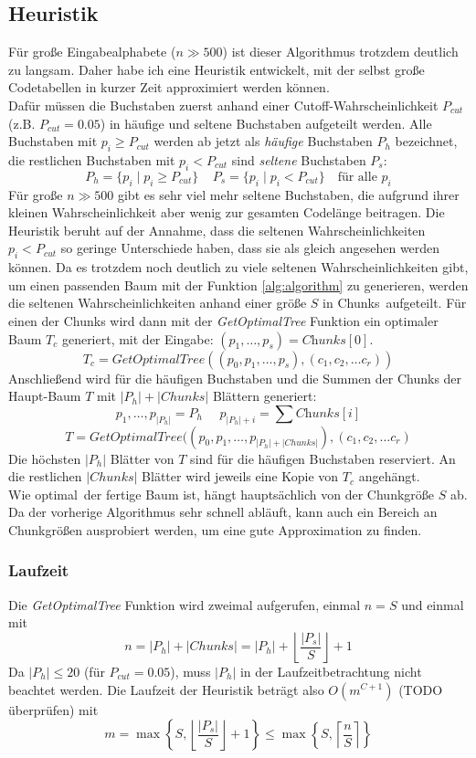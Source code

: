 \documentclass[a4paper,10pt,ngerman]{scrartcl}
\begin{document}
    \subsection{Heuristik}
    Für große Eingabealphabete ($n \gg 500$) ist dieser Algorithmus trotzdem deutlich zu langsam.
    Daher habe ich eine Heuristik entwickelt, mit der selbst große Codetabellen in kurzer Zeit approximiert werden können. \\
    Dafür müssen die Buchstaben zuerst anhand einer Cutoff-Wahrscheinlichkeit $P_{cut}$ (z.B. $P_{cut} = 0.05$) in häufige und seltene Buchstaben aufgeteilt werden.
    Alle Buchstaben mit $p_i \ge P_{cut}$ werden ab jetzt als \textit{häufige} Buchstaben $P_h$ bezeichnet, die restlichen Buchstaben mit $p_i < P_{cut}$ sind \textit{seltene} Buchstaben $P_s$:
    \[P_{h} = \{p_i \mid p_i \ge P_{cut}\}~~~~~P_s = \{p_i \mid p_i < P_{cut}\} \text{~~~für alle $p_i$}\]
    Für große $n \gg 500$ gibt es sehr viel mehr seltene Buchstaben, die aufgrund ihrer kleinen Wahrscheinlichkeit aber wenig zur gesamten Codelänge beitragen.
    Die Heuristik beruht auf der Annahme, dass die seltenen Wahrscheinlichkeiten $p_i < P_{cut}$ so geringe Unterschiede haben, dass sie als gleich angesehen werden können.
    Da es trotzdem noch deutlich zu viele seltenen Wahrscheinlichkeiten gibt, um einen passenden Baum mit der Funktion \ref{alg:algorithm} zu generieren, werden die seltenen Wahrscheinlichkeiten anhand einer größe $S$ in \glqq Chunks\grqq~aufgeteilt.
    Für einen der Chunks wird dann mit der \textit{GetOptimalTree} Funktion ein optimaler Baum $T_c$ generiert, mit der Eingabe: $(p_1, \dots, p_s) = \textit{Chunks}[0]$.
    \[T_c = \textit{GetOptimalTree}((p_0, p_1, \dots, p_s), (c_1, c_2, \dots c_r))\]
    Anschließend wird für die häufigen Buchstaben und die Summen der Chunks der Haupt-Baum $T$ mit $|P_h| + |Chunks|$ Blättern generiert:
    \[p_1, \dots, p_{|P_h|} = P_h~~~~~~p_{|P_h| + i} = \sum \textit{Chunks}[i]\]
    \[T = \textit{GetOptimalTree}((p_0, p_1, \dots, p_{|P_h| + |Chunks|}), (c_1, c_2, \dots c_r)\]
    Die höchsten $|P_h|$ Blätter von $T$ sind für die häufigen Buchstaben \glqq reserviert\grqq.
    An die restlichen $|Chunks|$ Blätter wird jeweils eine Kopie von $T_c$ angehängt. \\
    Wie \glqq optimal\grqq~der fertige Baum ist, hängt hauptsächlich von der Chunkgröße $S$ ab.
    Da der vorherige Algorithmus sehr schnell abläuft, kann auch ein Bereich an Chunkgrößen ausprobiert werden, um eine gute Approximation zu finden.

    \subsubsection{Laufzeit}
    Die \textit{GetOptimalTree} Funktion wird zweimal aufgerufen, einmal $n = S$ und einmal mit
    \[n = |P_h| + |Chunks| = |P_h| +  \left\lfloor   \frac {|P_s|} {S}  \right\rfloor + 1\]
    Da $|P_h| \le 20$ (für $P_{cut} = 0.05$), muss $|P_h|$ in der Laufzeitbetrachtung nicht beachtet werden.
    Die Laufzeit der Heuristik beträgt also $O(m^{C+1})$ (TODO überprüfen) mit
    \[m = \max \left\{ S, \left\lfloor   \frac {|P_s|} {S}  \right\rfloor + 1 \right\} \le \max \left\{S, \left\lceil \frac n S \right\rceil \right\}\]
\end{document}

